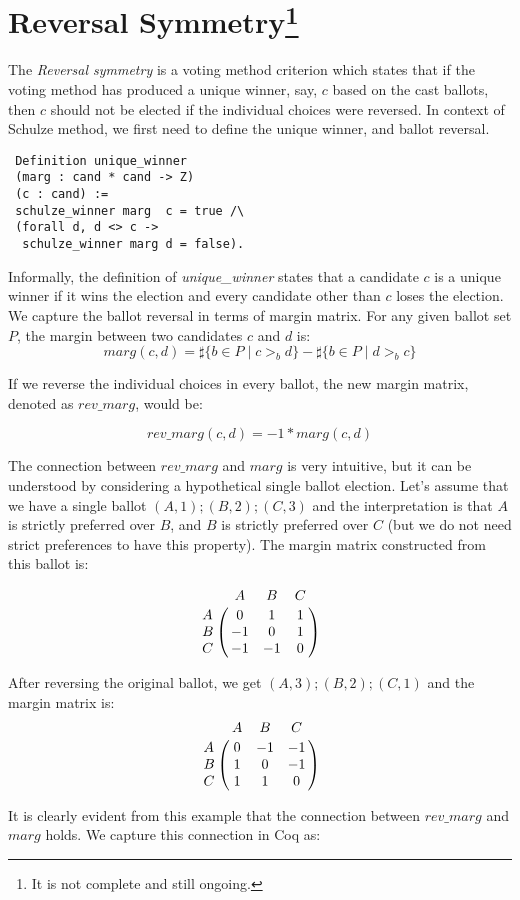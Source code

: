 \documentclass[compsoc,conference,a4paper,10pt,times]{IEEEtran}
\begin{document}
\section{Reversal Symmetry\footnote{It is not complete and still ongoing.}}
 The \textit{Reversal symmetry} is a voting method criterion which states that if the
 voting method has produced a unique 
  winner, say, $c$ based on the cast ballots, then $c$ should not be elected if the 
 individual choices were reversed. 
 In context of Schulze method, we first need to define the unique winner, and ballot reversal. 
 
 \begin{verbatim}
 Definition unique_winner 
 (marg : cand * cand -> Z) 
 (c : cand) :=
 schulze_winner marg  c = true /\
 (forall d, d <> c -> 
  schulze_winner marg d = false).
\end{verbatim}  
\noindent
Informally, the definition of \textit{unique\_winner} states that a 
candidate $c$ is a unique winner
if it wins the election and every candidate 
other than $c$ loses the election.
We capture the ballot reversal in terms of margin matrix. For any given ballot set $P$, 
the margin between two candidates $c$ and $d$ is: 
\[
  marg(c, d) = \sharp \lbrace b \in P \mid c >_b d \rbrace -
            \sharp \lbrace b \in P \mid d >_b c \rbrace
\] 

\noindent
If we reverse the individual choices in every ballot, the new margin matrix, denoted as $rev\_marg$, would be:

\[
  rev\_marg(c, d) = -1 * marg (c, d)  
\]    

\noindent
The connection between $rev\_marg$ and $marg$ is very intuitive, but it can be understood 
by considering a hypothetical single ballot election. Let's assume that we have 
a single ballot $(A, 1); (B, 2); (C, 3)$ and the interpretation is 
that $A$ is strictly preferred over $B$, and $B$ is strictly preferred over $C$ 
(but we do not need strict preferences to have this property).  The margin matrix
constructed from this ballot is: 

\[
\bordermatrix{ & A & B & C \cr
      A & 0 & 1 & 1 \cr
      B & -1 & 0 & 1 \cr
      C & -1 & -1 & 0 }
      \]
    
\noindent      
After reversing the original ballot, we get $(A, 3); (B, 2); (C, 1)$ and 
the margin matrix is:
\[
\bordermatrix{ & A & B & C \cr
      A & 0 & -1 & -1 \cr
      B & 1 & 0 & -1 \cr
      C & 1 & 1 & 0 }
      \]


\noindent
It is clearly evident from this example that the 
connection between $rev\_marg$ and $marg$  holds.
We capture this connection in Coq as:
\end{document}
